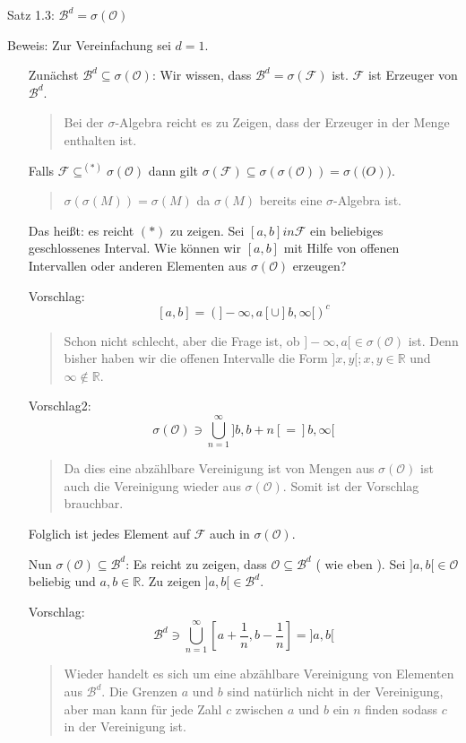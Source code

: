 Satz 1.3: $\mathcal B^d = \sigma(\mathcal O)$

Beweis: Zur Vereinfachung sei $d=1$.
\begin{itemize}
 \item[Zunächst $\mathcal B^d \subseteq \sigma(\mathcal O)$:]
Wir wissen, dass $\mathcal B^d = \sigma(\mathcal F)$ ist. $\mathcal F$ ist Erzeuger von $\mathcal B^d$.
\begin{quote}
 Bei der $\sigma$-Algebra reicht es zu Zeigen, dass der Erzeuger in der Menge enthalten ist.
\end{quote}
Falls $\mathcal F \subseteq^{(*)} \sigma(\mathcal O)$ dann gilt $\sigma( \mathcal F) \subseteq \sigma( \sigma( \mathcal O)) = \sigma(\mathcal(O))$.
\begin{quote}
 $\sigma(\sigma(M)) = \sigma(M)$ da $\sigma (M)$ bereits eine $\sigma$-Algebra ist.
\end{quote}
Das heißt: es reicht $(*)$ zu zeigen. Sei $[a,b] in \mathcal F$ ein beliebiges geschlossenes Interval. Wie können wir $[a,b]$ mit Hilfe von offenen Intervallen oder anderen Elementen aus $\sigma(\mathcal O)$ erzeugen?

Vorschlag:
$$ [a,b] = ( ]-\infty, a[ \cup ]b,\infty[ )^c$$
\begin{quote}
 Schon nicht schlecht, aber die Frage ist, ob $]-\infty, a[ \in \sigma(\mathcal O)$ ist. Denn bisher haben wir die offenen Intervalle die Form $]x,y[; x,y \in \mathbb R$ und $\infty \notin \mathbb R$.
\end{quote}

Vorschlag2:
$$ \sigma(\mathcal O) \ni \bigcup_{n=1}^\infty ]b,b+n[ = ]b,\infty[ $$
\begin{quote}
 Da dies eine abzählbare Vereinigung ist von Mengen aus $\sigma(\mathcal O)$ ist auch die Vereinigung wieder aus $\sigma(\mathcal O)$. Somit ist der Vorschlag brauchbar.
\end{quote}
Folglich ist jedes Element auf $\mathcal F$ auch in $\sigma(\mathcal O)$.
\item[Nun $\sigma(\mathcal O) \subseteq \mathcal B^d$:]
Es reicht zu zeigen, dass $\mathcal O \subseteq \mathcal B^d$ ( wie eben ). Sei $]a,b[ \in \mathcal O$ beliebig und $a,b \in \mathbb R$. Zu zeigen $]a,b[ \in \mathcal B^d$.

Vorschlag:
$$ \mathcal B^d \ni \bigcup_{n=1}^\infty [a+\frac{1}{n},b-\frac{1}{n}] = ]a,b[ $$
\begin{quote}
 Wieder handelt es sich um eine abzählbare Vereinigung von Elementen aus $\mathcal B^d$. Die Grenzen $a$ und $b$ sind natürlich nicht in der Vereinigung, aber man kann für jede Zahl $c$ zwischen $a$ und $b$ ein $n$ finden sodass $c$ in der Vereinigung ist.
\end{quote}
\end{itemize}

